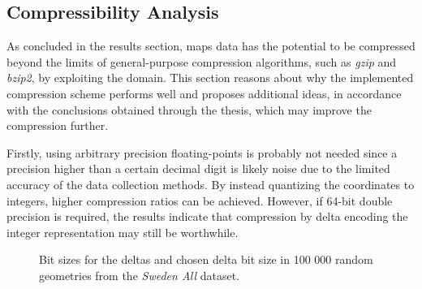 

\subsection{Compressibility Analysis}
\label{sec:compressanalys}
As concluded in the results section, maps data has the potential to be compressed beyond the limits of general-purpose compression algorithms, such as \textit{gzip} and \textit{bzip2}, by exploiting the domain. This section reasons about why the implemented compression scheme performs well and proposes additional ideas, in accordance with the conclusions obtained through the thesis, which may improve the compression further.

Firstly, using arbitrary precision floating-points is probably not needed since a precision higher than a certain decimal digit is likely noise due to the limited accuracy of the data collection methods. By instead quantizing the coordinates to integers, higher compression ratios can be achieved. However, if 64-bit double precision is required, the results indicate that compression by delta encoding the integer representation may still be worthwhile.

\begin{figure}[H]%
    \centering
    \qquad
    \caption{Bit sizes for the deltas and chosen delta bit size in 100 000 random geometries from the \textit{Sweden All} dataset.}%
    \label{fig:swedenbitsize}%
\end{figure}

